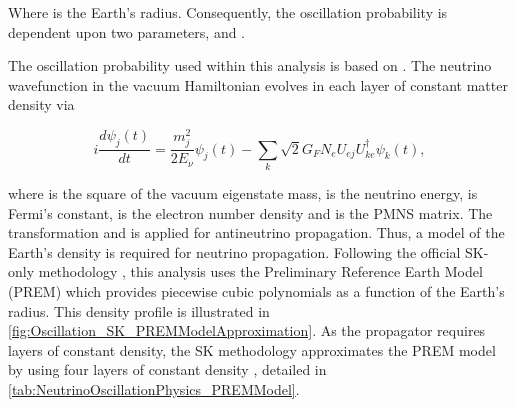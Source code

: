
Where  is the Earth's radius. Consequently, the oscillation probability is dependent upon two parameters,  and .

The oscillation probability used within this analysis is based on \cite{Barger:1980tf}. The neutrino wavefunction in the vacuum Hamiltonian evolves in each layer of constant matter density via

\begin{equation}
  i \frac{d\psi_{j}(t)}{dt} = \frac{m_{j}^{2}}{2E_{\nu}} \psi_{j}(t) - \sum_{k} \sqrt{2} G_{F} N_{e} U_{ej} U_{ke}^{\dagger} \psi_{k}(t),
\end{equation}

where  is the square of the  vacuum eigenstate mass,  is the neutrino energy,  is Fermi's constant,  is the electron number density and  is the PMNS matrix. The transformation  and  is applied for antineutrino propagation. Thus, a model of the Earth's density is required for neutrino propagation. Following the official SK-only methodology \cite{thesis_roger}, this analysis uses the Preliminary Reference Earth Model (PREM) \cite{Dziewonski1981-sp} which provides piecewise cubic polynomials as a function of the Earth's radius. This density profile is illustrated in \autoref{fig:Oscillation_SK_PREMModelApproximation}. As the propagator requires layers of constant density, the SK methodology approximates the PREM model by using four layers of constant density \cite{thesis_roger}, detailed in \autoref{tab:NeutrinoOscillationPhysics_PREMModel}.

